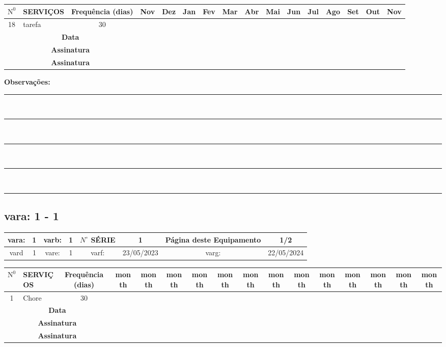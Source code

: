 \documentclass[a4paper, 12pt]{article}
\begin{document}
\begin{adjustbox}{width=18cm ,center}
\begin{tabular}{|c|p{12cm}|c|c|c|c|c|c|c|c|c|c|c|c|c|c|}
\hline $\mathrm{N}^0$ & SERVIÇOS & Frequência (dias) & Nov & Dez & Jan & Fev & Mar & Abr & Mai & Jun & Jul & Ago & Set & Out & Nov \\
\hline 18 & tarefa & 30 & & & & & & & & & & & & & \\
\hline
\multicolumn{3}{|c|}{\textbf{Data }} &  & & & & & & & &  &  & &  &  \\
\hline \multicolumn{3}{|c|}{\textbf{Assinatura }} &  & & & & & & & & & &   &  &  \\
\hline \multicolumn{3}{|c|}{\textbf{Assinatura }} &  & & & & & & & & & &   &  &  \\
\hline
\end{tabular}
\end{adjustbox}


\footnotesize\textbf{Observações:}\\[0.1cm]
\noindent\rule{\textwidth}{0.2mm} \\[0.1cm]
\noindent\rule{\textwidth}{0.2mm} \\[0.1cm]
\noindent\rule{\textwidth}{0.2mm} \\[0.1cm]
\noindent\rule{\textwidth}{0.2mm} \\[0.1cm]
\noindent\rule{\textwidth}{0.2mm}
\newpage
\subsection{vara: 1 - 1}



\begin{adjustbox}{width=18cm ,center}
\begin{tabular}{|c|c|c|c|c|c|c|c|}
\hline vara: & 1 & varb: & 1 & $N^{\circ}$ SÉRIE & 1 & \textbf{Página deste Equipamento} & \textbf{1/2} \\
\hline vard & 1 & vare: & 1 & varf: & 23/05/2023 & varg: & 22/05/2024 \\
\hline
\end{tabular}
\end{adjustbox}

\begin{adjustbox}{width=18cm ,center}
\begin{tabular}{|c|p{12cm}|c|c|c|c|c|c|c|c|c|c|c|c|c|c|}
\hline $\mathrm{N}^0$ & SERVIÇOS & Frequência (dias) & month & month & month & month & month & month & month & month & month & month & month & month & month \\
\hline 1 &  Chore & 30 &  &  & &  & &  &  & &  & &  &  &  \\
\hline
\hline
\multicolumn{3}{|c|}{\textbf{Data }} &  & & & & & & & &  &  & &  &  \\
\hline \multicolumn{3}{|c|}{\textbf{Assinatura }} &  & & & & & & & & & &   &  &  \\
\hline \multicolumn{3}{|c|}{\textbf{Assinatura }} &  & & & & & & & & & &   &  &  \\
\hline
\end{tabular}
\end{adjustbox}
\end{document}
